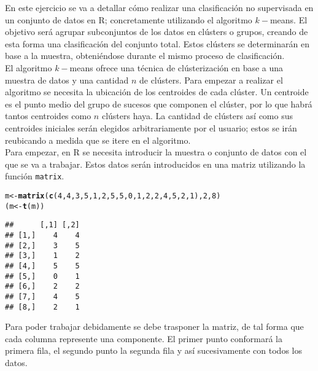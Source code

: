\documentclass[12pt]{report}\usepackage[]{graphicx}\usepackage[dvipsnames]{xcolor}
\makeatletter
\newcommand{\hlnum}[1]{\textcolor[rgb]{0.686,0.059,0.569}{#1}}%
\newcommand{\hlstd}[1]{\textcolor[rgb]{0.345,0.345,0.345}{#1}}%
\newcommand{\hlkwb}[1]{\textcolor[rgb]{0.69,0.353,0.396}{#1}}%
\newcommand{\hlkwd}[1]{\textcolor[rgb]{0.737,0.353,0.396}{\textbf{#1}}}%
\newenvironment{kframe}{%
 \def\at@end@of@kframe{}%
 \ifinner\ifhmode%
  \def\at@end@of@kframe{\end{minipage}}%
  \begin{minipage}{\columnwidth}%
 \fi\fi%
 \def\FrameCommand##1{\hskip\@totalleftmargin \hskip-\fboxsep
 \colorbox{shadecolor}{##1}\hskip-\fboxsep
     \hskip-\linewidth \hskip-\@totalleftmargin \hskip\columnwidth}%
 \MakeFramed {\advance\hsize-\width
   \@totalleftmargin\z@ \linewidth\hsize
   \@setminipage}}%
 {\par\unskip\endMakeFramed%
 \at@end@of@kframe}
\newenvironment{knitrout}{}{} %
\makeatother
\begin{document}
				En este ejercicio se va a detallar cómo realizar una clasificación no supervisada en un conjunto de datos en R; concretamente utilizando el algoritmo $k-$means. El objetivo será agrupar subconjuntos de los datos en clústers o grupos, creando de esta forma una clasificación del conjunto total. Estos clústers se determinarán en base a la muestra, obteniéndose durante el mismo proceso de clasificación.\\
				
				El algoritmo $k-$means ofrece una técnica de clústerización en base a una muestra de datos y una cantidad $n$ de clústers. Para empezar a realizar el algoritmo se necesita la ubicación de los centroides de cada clúster. Un centroide es el punto medio del grupo de sucesos que componen el clúster, por lo que habrá tantos centroides como $n$ clústers haya. La cantidad de clústers así como sus centroides iniciales serán elegidos arbitrariamente por el usuario; estos se irán reubicando a medida que se itere en el algoritmo. \\
				
				Para empezar, en R se necesita introducir la muestra o conjunto de datos con el que se va a trabajar. Estos datos serán introducidos en una matriz utilizando la función \texttt{matrix}.
				
\begin{knitrout}
\color{fgcolor}\begin{kframe}
\begin{alltt}
\hlstd{m} \hlkwb{<-} \hlkwd{matrix}\hlstd{(}\hlkwd{c}\hlstd{(}\hlnum{4}\hlstd{,}\hlnum{4}\hlstd{,} \hlnum{3}\hlstd{,}\hlnum{5}\hlstd{,} \hlnum{1}\hlstd{,}\hlnum{2}\hlstd{,} \hlnum{5}\hlstd{,}\hlnum{5}\hlstd{,} \hlnum{0}\hlstd{,}\hlnum{1}\hlstd{,} \hlnum{2}\hlstd{,}\hlnum{2}\hlstd{,} \hlnum{4}\hlstd{,}\hlnum{5}\hlstd{,} \hlnum{2}\hlstd{,}\hlnum{1}\hlstd{),}\hlnum{2}\hlstd{,}\hlnum{8}\hlstd{)}
\hlstd{(m} \hlkwb{<-} \hlkwd{t}\hlstd{(m))}
\end{alltt}
\begin{verbatim}
##      [,1] [,2]
## [1,]    4    4
## [2,]    3    5
## [3,]    1    2
## [4,]    5    5
## [5,]    0    1
## [6,]    2    2
## [7,]    4    5
## [8,]    2    1
\end{verbatim}
\end{kframe}
\end{knitrout}
				
				Para poder trabajar debidamente se debe trasponer la matriz, de tal forma que cada columna represente una componente. El primer punto conformará la primera fila, el segundo punto la segunda fila y así sucesivamente con todos los datos.\\
				
\end{document}
